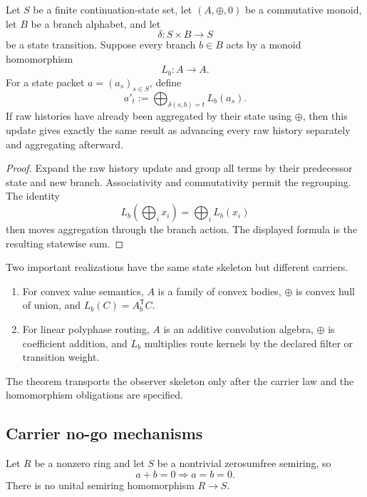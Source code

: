 \begin{theorem}
\label{thm:block18-carrier-indexed-observer}
Let \(S\) be a finite continuation-state set, let \((A,\oplus,0)\) be a commutative monoid, let \(B\) be a branch alphabet, and let
\[
 \delta:S\times B\longrightarrow S
\]
be a state transition.  Suppose every branch \(b\in B\) acts by a monoid homomorphism
\[
 L_b:A\longrightarrow A.
\]
For a state packet \(a=(a_s)_{s\in S}\), define
\[
 a'_t
 :=
 \bigoplus_{\delta(s,b)=t}L_b(a_s).
\]
If raw histories have already been aggregated by their state using \(\oplus\), then this update gives exactly the same result as advancing every raw history separately and aggregating afterward.
\end{theorem}

\begin{proof}
Expand the raw history update and group all terms by their predecessor state and new branch.  Associativity and commutativity permit the regrouping.  The identity
\[
 L_b\!\left(\bigoplus_i x_i\right)
 =
 \bigoplus_i L_b(x_i)
\]
then moves aggregation through the branch action.  The displayed formula is the resulting statewise sum.
\end{proof}

Two important realizations have the same state skeleton but different carriers.
\begin{enumerate}
\item For convex value semantics, \(A\) is a family of convex bodies, \(\oplus\) is convex hull of union, and \(L_b(C)=A_b^{\mathsf T}C\).
\item For linear polyphase routing, \(A\) is an additive convolution algebra, \(\oplus\) is coefficient addition, and \(L_b\) multiplies route kernels by the declared filter or transition weight.
\end{enumerate}
The theorem transports the observer skeleton only after the carrier law and the homomorphism obligations are specified.

\subsection{Carrier no-go mechanisms}
\label{subsec:block18-carrier-no-go}

\begin{theorem}
\label{thm:block18-cancellation-barrier}
Let \(R\) be a nonzero ring and let \(S\) be a nontrivial zerosumfree semiring, so
\[
 a+b=0\Longrightarrow a=b=0.
\]
There is no unital semiring homomorphism \(R\to S\).
\end{theorem}

